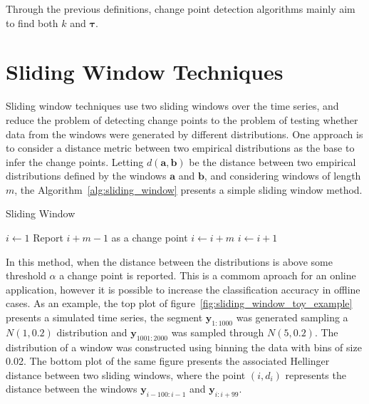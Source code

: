 Through the previous definitions, change point detection algorithms mainly aim to find both $k$ and $\boldsymbol \tau$.

\section{Sliding Window Techniques}

Sliding window techniques use two sliding windows over the time series, and reduce the problem of detecting change points to the problem of testing whether data from the windows were generated by different distributions. One approach is to consider a distance metric between two empirical distributions as the base to infer the change points. Letting $d(\mathbf{a}, \mathbf{b})$ be the distance between two empirical distributions defined by the windows $\mathbf{a}$ and $\mathbf{b}$, and considering windows of length $m$, the Algorithm~\ref{alg:sliding_window} presents a simple sliding window method.

\begin{algorithm}
    \caption{Sliding Window}
    \label{alg:sliding_window}
	\begin{algorithmic}[1]
		\State $i \gets 1$
                \State Report $i + m - 1$ as a change point
		        \State $i \gets i + m$
             \Else
		        \State $i \gets i + 1$
             \EndIf
        \EndWhile
	\end{algorithmic}
\end{algorithm}

In this method, when the distance between the distributions is above some threshold $\alpha$ a change point is reported. This is a commom aproach for an online application, however it is possible to increase the classification accuracy in offline cases. As an example, the top plot of figure~\ref{fig:sliding_window_toy_example} presents a simulated time series, the segment $\mathbf{y}_{1 : 1000}$ was generated sampling a $N(1, 0.2)$ distribution and $\mathbf{y}_{1001 : 2000}$ was sampled through $N(5, 0.2)$. The distribution of a window was constructed using binning the data with bins of size 0.02. The bottom plot of the same figure presents the associated Hellinger distance between two sliding windows, where the point $(i, d_{i})$ represents the distance between the windows $\mathbf{y}_{i - 100 : i - 1}$ and $\mathbf{y}_{i : i + 99}$.

